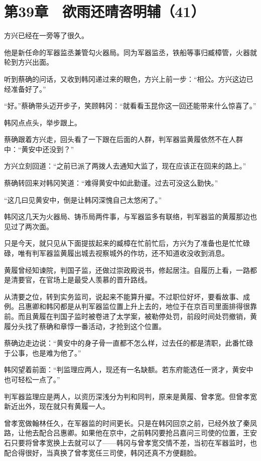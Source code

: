 \section{第39章　欲雨还晴咨明辅（41）}

方兴已经在一旁等了很久。

他是新任命的军器监丞兼管勾火器局。同为军器监丞，铁船等事归臧樟管，火器就轮到方兴出面。

听到蔡确的问话，又收到韩冈递过来的眼色，方兴上前一步：“相公。方兴这边已经准备好了。”

“好。”蔡确带头迈开步子，笑顾韩冈：“就看看玉昆你这一回还能带来什么惊喜了。”

韩冈点点头，举步跟上。

蔡确跟着方兴走，回头看了一下跟在后面的人群，判军器监黄履依然不在人群中：“黄安中还没到？”

方兴立刻回道：“之前已派了两拨人去通知大监了，现在应该正在回来的路上。”

蔡确转回来对韩冈笑道：“难得黄安中如此勤谨。过去可没这么勤快。”

“这几曰见黄安中，倒是让韩冈深愧自己太悠闲了。”

韩冈这几天为火器局、铸币局两件事，与军器监多有联络，判军器监的黄履那边也见过了两次面。

只是今天，就只见从下面提拔起来的臧樟在忙前忙后，方兴为了准备也是忙忙碌碌，唯有判军器监黄履出城去视察城外的作坊，还不知道收没收到消息。

黄履曾经知谏院，判国子监，还做过崇政殿说书，修起居注。自履历上看，一路都是清要官，在官场上是最受人羡慕的晋升路线。

从清要之位，转到实务监司，说起来不能算升擢。不过职位好坏，要看故事、成例。吕惠卿和韩冈都是从判军器监位置上升上去的，地位于在京百司里面排得很靠前。而且黄履在判国子监时被卷进了太学案，被勒停处罚，前段时间处罚撤销，黄履分头找了蔡确和章惇一番活动，才抢到这个位置。

蔡确边走边说：“黄安中的身子骨一直都不怎么样，过去任的都是清职，此番忙碌于公事，也是难为他了。”

韩冈望着前面：“判监理应两人，现还有一名缺额。若东府能选任一贤才，黄安中也可轻松一点了。”

判军器监理应是两人，以资历深浅分为判和同判，原来是黄履、曾孝宽。但曾孝宽新近出外，现在就只有黄履一人。

曾孝宽做翰林任久，在军器监的时间更长。只是在韩冈回京之前，已经外放了秦凤路，让他去配合吕惠卿。如果他在京中，之前韩冈要抢吕嘉问三司使的位置，王安石只要将曾孝宽换上去就可以了——韩冈与曾孝宽交情不差，当初在军器监时，也配合得很好，当真换了曾孝宽任三司使，韩冈还真不方便翻脸。


